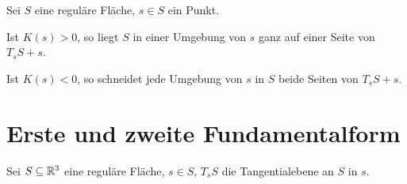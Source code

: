 \begin{bemerkung}%
    Sei $S$ eine reguläre Fläche, $s \in S$ ein Punkt.
    \begin{bemenum}
        \item Ist $K(s) > 0$, so liegt $S$ in einer Umgebung von $s$
              ganz auf einer Seite von $T_s S + s$.
        \item Ist $K(s) < 0$, so schneidet jede Umgebung von $s$ in $S$
              beide Seiten von $T_s S + s$.
    \end{bemenum}
\end{bemerkung}
\section{Erste und zweite Fundamentalform}%
Sei $S \subseteq \mathbb{R}^3$ eine reguläre Fläche, $s \in S$, $T_s S$ die Tangentialebene
an $S$ in $s$.

